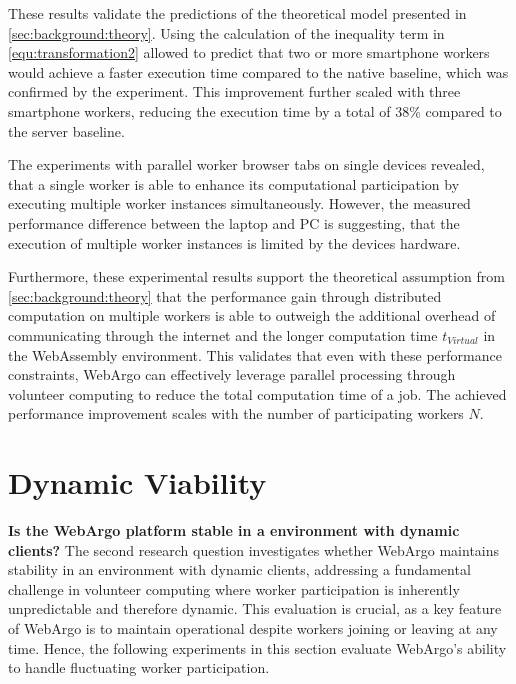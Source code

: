 These results validate the predictions of the theoretical model presented in \autoref{sec:background:theory}. Using the calculation of the inequality term in \eqref{equ:transformation2} allowed to predict that two or more smartphone workers would achieve a faster execution time compared to the native baseline, which was confirmed by the experiment. This improvement further scaled with three smartphone workers, reducing the execution time by a total of 38\% compared to the server baseline.

The experiments with parallel worker browser tabs on single devices revealed, that a single worker is able to enhance its computational participation by executing multiple worker instances simultaneously. However, the measured performance difference between the laptop and \acs{PC} is suggesting, that the execution of multiple worker instances is limited by the devices hardware.

Furthermore, these experimental results support the theoretical assumption from \autoref{sec:background:theory} that the performance gain through distributed computation on multiple workers is able to outweigh the additional overhead of communicating through the internet and the longer computation time $t_{Virtual}$ in the WebAssembly environment. This validates that even with these performance constraints, WebArgo can effectively leverage parallel processing through volunteer computing to reduce the total computation time of a job. The achieved performance improvement scales with the number of participating workers $N$.

\section{Dynamic Viability}
\label{sec:evaluation:dynamic}
\textbf{Is the WebArgo platform stable in a environment with dynamic clients?}
\newline
The second research question investigates whether WebArgo maintains stability in an environment with dynamic clients, addressing a fundamental challenge in volunteer computing where worker participation is inherently unpredictable and therefore dynamic. This evaluation is crucial, as a key feature of WebArgo is to maintain operational despite workers joining or leaving at any time. Hence, the following experiments in this section evaluate WebArgo's ability to handle fluctuating worker participation.

